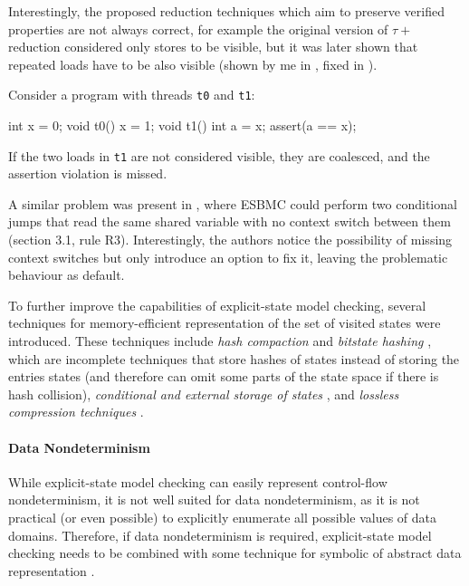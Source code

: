 Interestingly, the proposed reduction techniques which aim to preserve verified
properties are not always correct, for example the original version of $\tau+$
reduction considered only stores to be visible, but it was later shown that
repeated loads have to be also visible (shown by me in , fixed in
).\begin{marginnote}%
Consider a program with threads \texttt{t0} and \texttt{t1}:

\medskip
\begin{cppcode}
  int x = 0;
  void t0() {
    x = 1;
  }
  void t1() {
    int a = x;
    assert(a == x);
  }
\end{cppcode}
\smallskip

If the two loads in \texttt{t1} are not considered visible, they are coalesced,
and the assertion violation is missed.
\end{marginnote}
%
A similar problem was present in , where ESBMC could
perform two conditional jumps that read the same shared variable with no
context switch between them (section 3.1, rule R3).
Interestingly, the authors notice the possibility of missing context switches
but only introduce an option to fix it, leaving the problematic behaviour as
default.

To further improve the capabilities of explicit-state model checking, several
techniques for memory-efficient representation of the set of visited states
were introduced.
These techniques include \emph{hash compaction} and \emph{bitstate
hashing} , which are incomplete techniques that store
hashes of states instead of storing the entries states (and therefore can omit
some parts of the state space if there is hash collision),
\emph{conditional and external storage of states} , and
\emph{lossless compression techniques} .

\paragraph{Data Nondeterminism}
While explicit-state model checking can easily represent control-flow
nondeterminism, it is not well suited for data nondeterminism, as it is not
practical (or even possible) to explicitly enumerate all possible values of
data domains.
Therefore, if data nondeterminism is required, explicit-state model checking
needs to be combined with some technique for symbolic of abstract data
representation .

